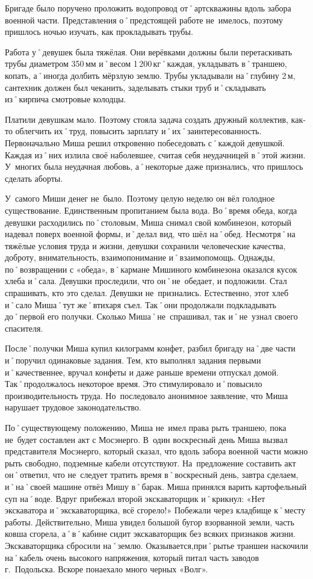 Бригаде было поручено проложить водопровод от˚артскважины вдоль забора военной части. Представления о˚предстоящей работе не~имелось, поэтому пришлось ночью изучать, как прокладывать трубы.

Работа у˚девушек была тяжёлая. Они верёвками должны были перетаскивать трубы диаметром 350\,мм и˚весом 1\,200\,кг˚каждая, укладывать в˚траншею, копать, а˚иногда долбить мёрзлую землю. Трубы укладывали на˚глубину 2\,м, сантехник должен был чеканить, заделывать стыки труб и˚складывать из˚кирпича смотровые колодцы.

Платили девушкам мало. Поэтому стояла задача создать дружный коллектив, как-то облегчить их˚труд, повысить зарплату и˚их˚заинтересованность. Первоначально Миша решил откровенно побеседовать с˚каждой девушкой. Каждая из˚них излила своё наболевшее, считая себя неудачницей в˚этой жизни. У~многих была неудачная любовь, а˚некоторые даже признались, что пришлось сделать аборты.

У~самого Миши денег не~было. Поэтому целую неделю он вёл голодное существование. Единственным пропитанием была вода. Во˚время обеда, когда девушки расходились по˚столовым, Миша снимал свой комбинезон, который надевал поверх военной формы, и˚делал вид, что шёл на˚обед. Несмотря˚на тяжёлые условия труда и жизни, девушки сохранили человеческие качества, доброту, внимательность, взаимопонимание и˚взаимопомощь. Однажды, по˚возвращении с «обеда», в˚кармане Мишиного комбинезона оказался кусок хлеба и˚сала. Девушки проследили, что он˚не~обедает, и подложили. Стал спрашивать, кто это сделал. Девушки не~признались. Естественно, этот хлеб и˚сало Миша˚тут же˚втихаря съел. Так˚они продолжали подкладывать до˚первой его получки. Сколько Миша˚не~спрашивал, так и˚не~узнал своего спасителя.

После˚получки Миша купил килограмм конфет, разбил бригаду на˚две части и˚поручил одинаковые задания. Тем, кто выполнял задания первыми и˚качественнее, вручал конфеты и даже раньше времени отпускал домой. Так˚продолжалось некоторое время. Это стимулировало и˚повысило производительность труда. Но~последовало анонимное заявление, что Миша нарушает трудовое законодательство.

По˚существующему положению, Миша не~имел права рыть траншею, пока не~будет составлен акт с Мосэнерго. В~один воскресный день Миша вызвал представителя Мосэнерго, который сказал, что вдоль забора военной части можно рыть свободно, подземные кабели отсутствуют. На~предложение составить акт он˚ответил, что не~следует тратить время в˚воскресный день, завтра сделаем, и˚на˚своей машине отвёз Мишу в˚барак. Миша принялся варить картофельный суп на˚воде. Вдруг прибежал второй экскаваторщик и˚крикнул: «Нет экскаватора и˚экскаваторщика, всё сгорело!» Побежали через кладбище к˚месту работы. Действительно, Миша увидел большой бугор взорванной земли, часть ковша сгорела, а˚в˚кабине сидит экскаваторщик без всяких признаков жизни. Экскаваторщика сбросили на˚землю. Оказывается,при˚рытье траншеи наскочили на˚кабель очень высокого напряжения, который питал часть заводов г.~Подольска. Вскоре понаехало много черных «Волг». 


